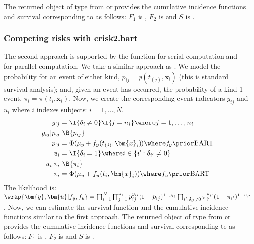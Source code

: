 \documentclass[article]{jss}
\begin{document}
The returned object of type  from 
or  provides the cumulative incidence functions
and survival corresponding to  as follows: $F_1$ is
, $F_2$ is  and $S$ is .

\subsubsection{Competing risks with crisk2.bart}

The second approach is supported by the function 
for serial computation and\\  for parallel
computation.  We take a similar approach as \citet{NicovanH10}.  We
model the probability for an event of either kind,
$p_{ij}=p(t_{(j)}, \bm{x}_i)$ (this is standard survival analysis);
and, given an event has occurred, the probability of a kind 1 event,
$\pi_{i}=\pi(t_{i}, \bm{x}_i)$.  Now, we create the corresponding
event indicators $y_{ij}$ and $u_i$ where $i$ indexes subjects:
$i=1, \dots, N$.
\begin{align*}
y_{ij} & = \I{\delta_i\not=0} \I{j=n_i} \where j=1, \dots, n_i\\ %
y_{ij}|p_{ij} & ~ \B{p_{ij}} \\ %
 p_{ij} & = \Phi(\mu_y+f_y(t_{(j)}, {\bm{x}}_{i})) \where f_y \prior \mathrm{BART} \\
u_{i} & = \I{\delta_i=1} \where i \in \{i' : \delta_{i'}\not=0 \} \\
u_{i}|\pi_{i} & ~ \B{\pi_{i}} \\ %
 \pi_{i} & = \Phi(\mu_u+f_u(t_{i}, {\bm{x}}_{i})) \where f_u \prior \mathrm{BART} 
\end{align*}
The likelihood is: $\wrap{\bm{y},\bm{u}|f_y, f_u} = \prod_{i=1}^N 
\prod_{j=1}^{n_i} p_{ij}^{y_{ij}} (1-p_{ij})^{1-y_{ij}}
\prod_{i' : \delta_{i'}\not=0} \pi_{i'}^{u_{i'}} (1-\pi_{i'})^{1-u_{i'}}$.
Now, we can estimate the survival function and the cumulative
incidence functions similar to the first approach.
The returned object of type  from 
or  provides the cumulative incidence functions
and survival corresponding to  as follows: $F_1$ is
, $F_2$ is  and $S$ is .
\end{document}
